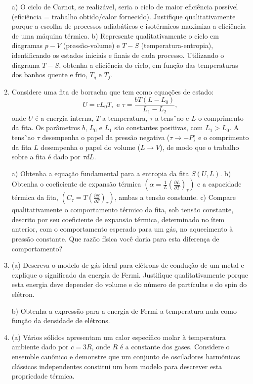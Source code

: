 \begin{enumerate}[start=1,label={\bfseries Q\arabic*.}]
a) O ciclo de Carnot, se realizável, seria o ciclo de maior eficiência possível (eficiência = trabalho obtido/calor fornecido). Justifique qualitativamente porque a escolha de processos adiabáticos e isotérmicos maximiza a eficiência de uma máquina térmica.
b) Represente qualitativamente o ciclo em diagramas $p-V$ (pressão-volume) e $T-S$ (temperatura-entropia), identificando os estados iniciais e finais de cada processo. Utilizando o diagrama $T-S$, obtenha a eficiência do ciclo, em função das temperaturas dos banhos quente e frio, $T_{q}$ e $T_{f}$.


\item Considere uma fita de borracha que tem como equações de estado:
$$
U = c L_{0} T, \mbox{ e } \tau =  \frac{b T( L - L_{0} )}{L_{1} - L_{2}},
$$
onde $U$ é a energia interna, $T$ a temperatura, $\tau$ a tens˜ao e $L$ o comprimento da fita. Os parâmetros $b$, $L_{0}$ e $L_{1}$ são constantes positivas, com $L_{1} > L_{0}$. A tens˜ao $\tau$ desempenha o papel da pressão negativa ($\tau \rightarrow - P$) e o comprimento da fita $L$ desempenha o papel do volume ($L \rightarrow V$), de modo que o trabalho sobre a fita é dado por $\tau d L$.

a) Obtenha a equação fundamental para a entropia da fita $S(U,L)$.
b) Obtenha o coeficiente de expansão térmica $\left(\alpha = \frac{1}{L} \left( \frac{\partial L}{\partial T} \right)_{\tau} \right)$ e a capacidade térmica da fita, $\left(C_{\tau} = T \left( \frac{\partial S}{\partial T} \right)_{\tau} \right)$, ambas a tensão constante.
c) Compare qualitativamente o comportamento térmico da fita, sob tensão constante, descrito por seu coeficiente de expansão térmica, determinado no ítem anterior, com o comportamento esperado para um gás, no aquecimento à pressão constante. Que razão física você daria para esta diferença de comportamento?






\item (a) Descreva o modelo de gás ideal para elétrons de condução de um metal e explique o significado da energia de Fermi. Justifique qualitativamente porque esta energia deve depender do volume e do número de partículas e do spin do elétron.

  b) Obtenha a expressão para a energia de Fermi a temperatura nula como função da densidade de elétrons.



\item (a) Vários sólidos apresentam um calor específico molar à temperatura ambiente dado por $c = 3R$, onde $R$ é a constante dos gases. Considere o ensemble canônico e demonstre que um conjunto de osciladores harmônicos clássicos independentes constitui um bom modelo para descrever esta propriedade térmica.


\end{enumerate}
